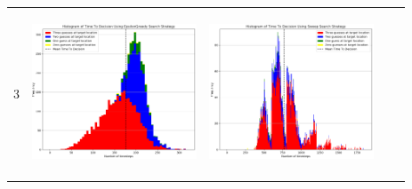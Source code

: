 \begin{landscape}
\begin{table}[h!]
\begin{tabular}{ | c | c | c | c | c |}
    3 & 
    \begin{minipage}[c][52mm][c]{49mm}
      \includegraphics[width=49mm, height=49mm]{Chapters/MultiAgentTargetDetection/Figs/Histograms/MultipleTarget/3/3EpsilonGreedyHistogram.png}
    \end{minipage}
    &
    \begin{minipage}[c][52mm][c]{49mm}
      \includegraphics[width=49mm, height=49mm]{Chapters/MultiAgentTargetDetection/Figs/Histograms/MultipleTarget/3/3SweepHistogram.png}


\end{minipage}
\end{tabular}
\end{table}
\end{landscape}
